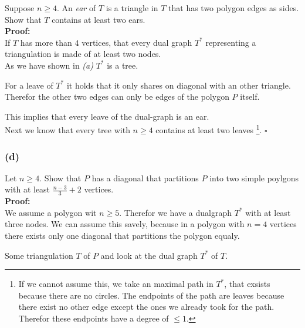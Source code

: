 \documentclass[11pt,a4paper,ngerman]{article}
\begin{document}
Suppose $n \geq 4$. An \emph{ear} of $T$ is a triangle in $T$ that has two polygon edges
as sides. Show that $T$ contains at least two ears.\\

\textbf{Proof:}\\

If $T$ has more than $4$ vertices, that every dual graph $T^*$ representing 
a triangulation is made of at least two nodes.\\
As we have shown in \emph{(a)} $T^*$ is a tree.

For a leave of $T^*$ it holds that it only shares on diagonal with an other triangle.
Therefor the other two edges can only be edges of the polygon $P$ itself.

This implies that every leave of the dual-graph is an ear.\\

Next we know that every tree with $n\geq 4$ contains at least two leaves
\footnote{If we cannot assume this, we take an maximal path in $T^*$, that exsists because there are no circles.
The endpoints of the path are leaves because there exist no other edge except the ones we already took for the path.
Therefor these endpoints have a degree of $\leq 1$.}.
\mbox{} \hfill $\square$

\subsubsection*{(d)}

Let $n \geq 4$. Show that $P$ has a diagonal that partitions $P$ into two
simple poylgons with at least $\frac{n-3}{3} + 2$ vertices.\\

\textbf{Proof:}\\

We assume a polygon wit $n\geq 5$. Therefor we have a dualgraph $T^*$ with at least
three nodes. We can assume this savely, because in a polygon with $n = 4$ vertices
there exists only one diagonal that partitions the polygon equaly.

Some triangulation $T$ of $P$ and look at the dual graph $T^*$ of $T$.
\end{document}
